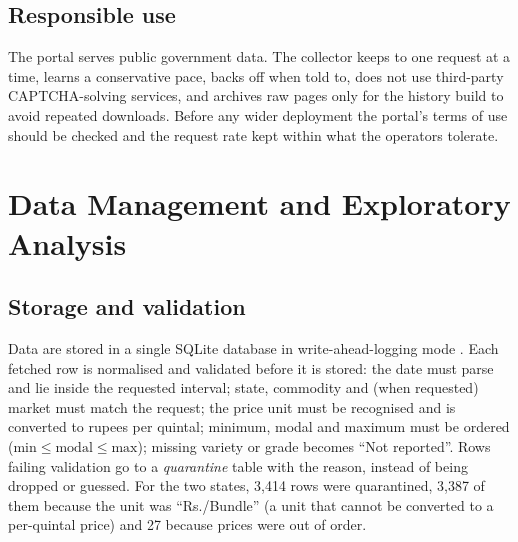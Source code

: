 \documentclass[12pt,a4paper,oneside]{report}
\numberwithin{equation}{chapter}
\numberwithin{figure}{chapter}
\numberwithin{table}{chapter}
\theoremstyle{definition}
\begin{document}
\section{Responsible use}\label{sec:responsible}
The portal serves public government data. The collector keeps to one request at a time, learns a conservative pace, backs off when told to, does not use third-party CAPTCHA-solving services, and archives raw pages only for the history build to avoid repeated downloads. Before any wider deployment the portal's terms of use should be checked and the request rate kept within what the operators tolerate.

\chapter{Data Management and Exploratory Analysis}

\section{Storage and validation}
Data are stored in a single SQLite database in write-ahead-logging mode \cite{sqlitewal}. Each fetched row is normalised and validated before it is stored: the date must parse and lie inside the requested interval; state, commodity and (when requested) market must match the request; the price unit must be recognised and is converted to rupees per quintal; minimum, modal and maximum must be ordered ($\text{min}\le\text{modal}\le\text{max}$); missing variety or grade becomes ``Not reported''. Rows failing validation go to a \emph{quarantine} table with the reason, instead of being dropped or guessed. For the two states, 3{,}414 rows were quarantined, 3{,}387 of them because the unit was ``Rs./Bundle'' (a unit that cannot be converted to a per-quintal price) and 27 because prices were out of order.
\end{document}
